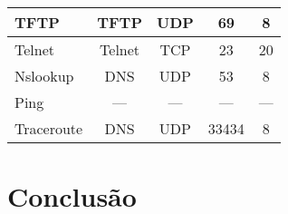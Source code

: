 \documentclass[runningheads]{llncs}
\begin{document}
\begin{center}
\begin{table}[]
{\begin{tabular}{|l|c|c|c|c|}
    TFTP                                              & TFTP                                                                                & UDP                                                                                 & 69                                                                               & 8                                                                                            \\ \hline
    Telnet                                            & Telnet                                                                              & TCP                                                                                 & 23                                                                               & 20                                                                                           \\ \hline
    Nslookup                                          & DNS                                                                                 & UDP                                                                                 & 53                                                                               & 8                                                                                            \\ \hline
    Ping                                              & ---                                                                                 & ---                                                                                 & ---                                                                              & ---                                                                                          \\ \hline
    \multicolumn{1}{|c|}{Traceroute}                  & DNS                                                                                 & UDP                                                                                 & 33434                                                                            & 8                                                                                            \\ \hline
    \end{tabular}%
    }
    \end{table}
    \end{center}
    
    \bigskip
    \pagebreak
    
\section{Conclusão}
    
\end{document}
